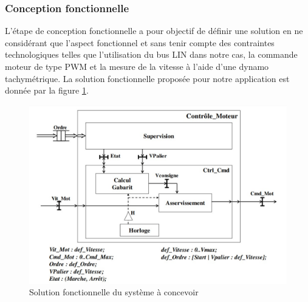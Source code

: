 \documentclass[a4paper]{article}
\begin{document}
	\subsubsection{Conception fonctionnelle}
	L’étape de conception fonctionnelle a pour objectif de définir une solution en ne considérant que l’aspect fonctionnel et sans tenir compte des contraintes technologiques telles que l’utilisation du bus LIN dans notre cas, la commande moteur de type PWM et la mesure de la vitesse à l’aide d’une dynamo tachymétrique. La solution fonctionnelle proposée pour notre application est donnée par la figure \ref{pic2}.
	\begin{figure}[htbp]
		\centering
		\includegraphics[width=0.9\linewidth]{Solution fonctionnelle.jpg}
		\caption{Solution fonctionnelle du système à concevoir}
		\label{pic2}
	\end{figure}
	
\end{document}
